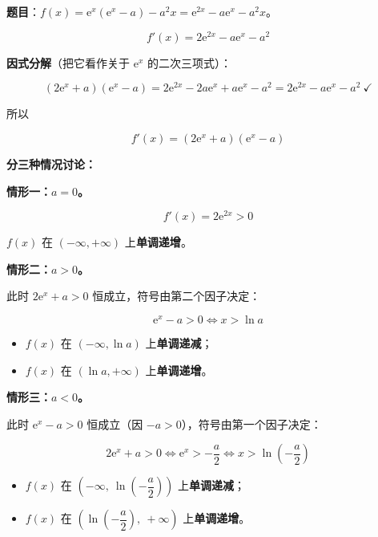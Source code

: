\par\medskip


\textbf{题目}：$f(x)=\mathrm e^{x}\left(\mathrm e^{x}-a\right)-a^{2}x=\mathrm e^{2x}-a\mathrm e^{x}-a^{2}x$。


\[f'(x)=2\mathrm e^{2x}-a\mathrm e^{x}-a^{2}\]

\textbf{因式分解}（把它看作关于 $\mathrm e^{x}$ 的二次三项式）：

\[\left(2\mathrm e^{x}+a\right)\left(\mathrm e^{x}-a\right)=2\mathrm e^{2x}-2a\mathrm e^{x}+a\mathrm e^{x}-a^{2}=2\mathrm e^{2x}-a\mathrm e^{x}-a^{2}\ \checkmark\]

所以

\[f'(x)=\left(2\mathrm e^{x}+a\right)\left(\mathrm e^{x}-a\right)\]

\textbf{分三种情况讨论：}

\textbf{情形一：$a=0$。}

\[f'(x)=2\mathrm e^{2x}>0\]

$f(x)$ 在 $(-\infty,+\infty)$ 上\textbf{单调递增}。

\textbf{情形二：$a>0$。}

此时 $2\mathrm e^{x}+a>0$ 恒成立，符号由第二个因子决定：

\[\mathrm e^{x}-a>0\iff x>\ln a\]

\begin{itemize}
\item $f(x)$ 在 $(-\infty,\ln a)$ 上\textbf{单调递减}；
\item $f(x)$ 在 $(\ln a,+\infty)$ 上\textbf{单调递增}。
\end{itemize}

\textbf{情形三：$a<0$。}

此时 $\mathrm e^{x}-a>0$ 恒成立（因 $-a>0$），符号由第一个因子决定：

\[2\mathrm e^{x}+a>0\iff \mathrm e^{x}>-\frac a2\iff x>\ln\left(-\frac a2\right)\]

\begin{itemize}
\item $f(x)$ 在 $\left(-\infty,\ \ln\left(-\dfrac a2\right)\right)$ 上\textbf{单调递减}；
\item $f(x)$ 在 $\left(\ln\left(-\dfrac a2\right),\ +\infty\right)$ 上\textbf{单调递增}。
\end{itemize}


